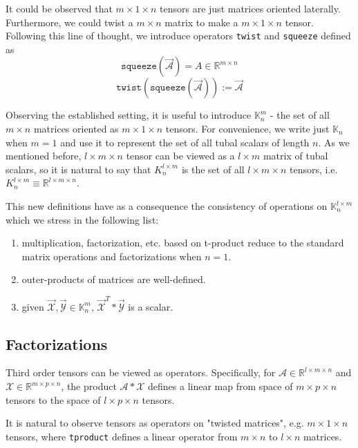 \documentclass[twoside]{article}
\newcommand{\code}[1]{\texttt{#1}}
\begin{document}
\begin{multicols}{2}
It could be observed that $m \times 1 \times n$ tensors are just matrices oriented laterally. Furthermore, we could twist a $m \times n$ matrix to make a $m \times 1 \times n$ tensor. Following this line of thought, we introduce operators \code{twist} and \code{squeeze} defined as
\[ \code{squeeze}(\overrightarrow{\mathcal{A}}) = A \in \mathbb{R}^{m \times n} \]
\[ \code{twist}(\code{squeeze}(\overrightarrow{\mathcal{A}})) := \overrightarrow{\mathcal{A}} \]

\noindent Observing the established setting, it is useful to introduce $\mathbb{K}^m_n$ - the set of all $m \times n$ matrices oriented as $m \times 1 \times n$ tensors. For convenience, we write just $\mathbb{K}_n$ when $m=1$ and use it to represent the set of all tubal scalars of length $n$. As we mentioned before, $l \times m \times n$ tensor can be viewed as a $l \times m$ matrix of tubal scalars, so it is natural to say that $K^{l \times m}_n$ is the set of all $l \times m \times n$ tensors, i.e. $K^{l \times m}_n \equiv \mathbb{R}^{l \times m \times n}$.

This new definitions have as a consequence the consistency of operations on $\mathbb{K}^{l \times m}_n$ which we stress in the following list:
\begin{enumerate}
	\item multiplication, factorization, etc. based on t-product reduce to the standard matrix operations and factorizations when $n=1$.
	\item outer-products of matrices are well-defined.
	\item given $\overrightarrow{\mathcal{X}}, \overrightarrow{\mathcal{Y}} \in \mathbb{K}^m_n$, $\overrightarrow{\mathcal{X}}^T \ast \overrightarrow{\mathcal{Y}}$ is a scalar.
\end{enumerate}

\subsection{Factorizations}
Third order tensors can be viewed as operators. Specifically, for $\mathcal{A} \in \mathbb{R}^{l \times m \times n}$ and $\mathcal{X} \in \mathbb{R}^{m \times p \times n}$, the product $\mathcal{A} \ast \mathcal{X}$ defines a linear map from space of $m \times p \times n$ tensors to the space of $l \times p \times n$ tensors.

It is natural to observe tensors as operators on "twisted matrices", e.g. $m \times 1 \times n$ tensors, where \code{tproduct} defines a linear operator from $m \times n$ to $l \times n$ matrices.


\end{multicols}
\end{document}
